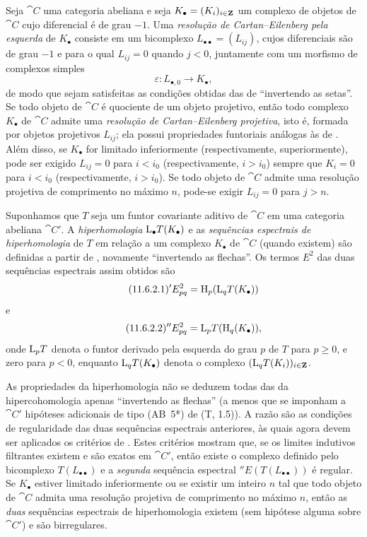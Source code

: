 \begin{env}[11.6.1]
\label{0.11.6.1}
Seja $\cat{C}$ uma categoria abeliana e seja $K_\bullet=(K_i)_{i\in\mathbf{Z}}$ um complexo de objetos de $\cat{C}$ cujo diferencial é de grau $-1$.
Uma \emph{resolução de Cartan--Eilenberg pela esquerda} de $K_\bullet$ consiste em um bicomplexo $L_{\bullet\bullet}=(L_{ij})$, cujos diferenciais são de grau $-1$ e para o qual $L_{ij}=0$ quando $j<0$, juntamente com um morfismo de complexos simples
\[
  \varepsilon:L_{\bullet,0}\longrightarrow K_\bullet,
\]
de modo que sejam satisfeitas as condições obtidas das de  ``invertendo as setas''.
Se todo objeto de $\cat{C}$ é quociente de um objeto projetivo, então todo complexo $K_\bullet$ de $\cat{C}$ admite uma \emph{resolução de Cartan--Eilenberg projetiva}, isto é, formada por objetos projetivos $L_{ij}$; ela possui propriedades funtoriais análogas às de .
Além disso, se $K_\bullet$ for limitado inferiormente (respectivamente, superiormente), pode ser exigido $L_{ij}=0$ para $i<i_0$ (respectivamente, $i>i_0$) sempre que $K_i=0$ para $i<i_0$ (respectivamente, $i>i_0$).
Se todo objeto de $\cat{C}$ admite uma resolução projetiva de comprimento no máximo $n$, pode-se exigir $L_{ij}=0$ para $j>n$.
\end{env}

\begin{env}[11.6.2]
\label{0.11.6.2}
Suponhamos que $T$ seja um funtor covariante aditivo de $\cat{C}$ em uma categoria abeliana $\cat{C}'$.
A \emph{hiperhomologia} $\mathrm{L}_\bullet T(K_\bullet)$ e as \emph{sequências espectrais de hiperhomologia} de $T$ em relação a um complexo $K_\bullet$ de $\cat{C}$ (quando existem) são definidas a partir de , novamente ``invertendo as flechas''.
Os termos $E^2$ das duas sequências espectrais assim obtidos são
\[
\label{0.11.6.2.1}
\tag{11.6.2.1}
  {}'E^2_{pq}
  =\HH_p(\LL_qT(K_\bullet))
\]
e
\[
\label{0.11.6.2.2}
\tag{11.6.2.2}
  {}''E^2_{pq}
  =\LL_pT(\HH_q(K_\bullet)),
\]
onde $\mathrm{L}_pT$ denota o funtor derivado pela esquerda do grau $p$ de $T$ para $p\geq0$, e zero para $p<0$, enquanto $\mathrm{L}_qT(K_\bullet)$ denota o complexo $(\mathrm{L}_qT(K_i))_{i\in\mathbf{Z}}$.

As propriedades da hiperhomologia não se deduzem todas das da hipercohomologia apenas ``invertendo as flechas'' (a menos que se imponham a $\cat{C}'$ hipóteses adicionais de tipo (AB~5*) de (T, 1.5)).
A razão são as condições de regularidade das duas sequências espectrais anteriores, às quais agora devem ser aplicados os critérios de .
Estes critérios mostram que, se os limites indutivos filtrantes existem e são exatos em $\cat{C}'$, então existe o complexo definido pelo bicomplexo $T(L_{\bullet\bullet})$ e a \emph{segunda} sequência espectral ${}''E(T(L_{\bullet\bullet}))$ é regular.
Se $K_\bullet$ estiver limitado inferiormente ou se existir um inteiro $n$ tal que todo objeto de $\cat{C}$ admita uma resolução projetiva de comprimento no máximo $n$, então as \emph{duas} sequências espectrais de hiperhomologia existem (sem hipótese alguma sobre $\cat{C}'$) e são birregulares.
\end{env}

